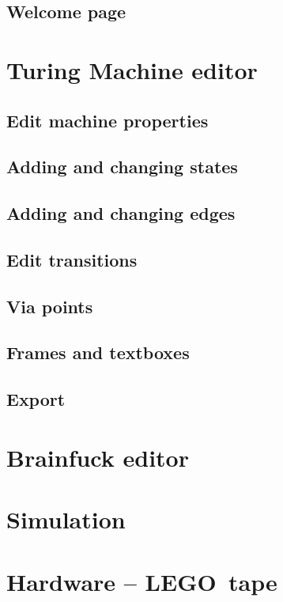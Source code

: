 \documentclass[%
  a4paper,%
  11pt,%
  blue,%
  ]{tubsartcl}
\begin{document}
\subsection{Welcome page}
\label{sec:welcome-page}


\section{Turing Machine editor}

\subsection{Edit machine properties}
\label{sec:edit-mach-prop}

\subsection{Adding and changing states}
\label{sec:add-edit-states}

\subsection{Adding and changing edges}
\label{sec:adding-chang-edges}

\subsection{Edit transitions}
\label{sec:edit-transitions}

\subsection{Via points}
\label{sec:via-points}

\subsection{Frames and textboxes}
\label{sec:frames-textboxes}

\subsection{Export}
\label{sec:export}

\section{Brainfuck editor}



\section{Simulation}



\section{Hardware -- LEGO\textregistered\, tape}
\end{document}
